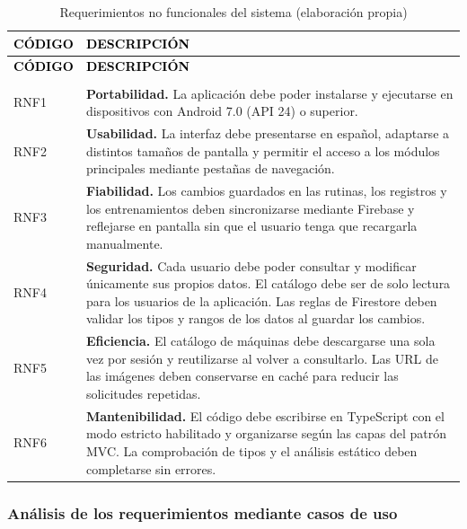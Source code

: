 \begin{longtable}{|L{2.2cm}|L{10.8cm}|}
\hline
{}
\textbf{\textcolor{black}{CÓDIGO}} &
\textbf{\textcolor{black}{DESCRIPCIÓN}} \\
\hline
\endfirsthead

\hline
{}
\textbf{\textcolor{black}{CÓDIGO}} &
\textbf{\textcolor{black}{DESCRIPCIÓN}} \\
\hline
\endhead

\endfoot

\caption{Requerimientos no funcionales del sistema (elaboración propia)}
\label{tab:rnf}\\
\endlastfoot

RNF1 & \textbf{Portabilidad.} La aplicación debe poder instalarse y
ejecutarse en dispositivos con Android 7.0 (API 24) o superior. \\
\hline

RNF2 & \textbf{Usabilidad.} La interfaz debe presentarse en español,
adaptarse a distintos tamaños de pantalla y permitir el acceso a los
módulos principales mediante pestañas de navegación. \\
\hline

RNF3 & \textbf{Fiabilidad.} Los cambios guardados en las rutinas, los
registros y los entrenamientos deben sincronizarse mediante Firebase
y reflejarse en pantalla sin que el usuario tenga que recargarla
manualmente. \\
\hline

RNF4 & \textbf{Seguridad.} Cada usuario debe poder consultar y modificar
únicamente sus propios datos. El catálogo debe ser de solo lectura
para los usuarios de la aplicación. Las reglas de Firestore deben
validar los tipos y rangos de los datos al guardar los cambios. \\
\hline

RNF5 & \textbf{Eficiencia.} El catálogo de máquinas debe descargarse
una sola vez por sesión y reutilizarse al volver a consultarlo.
Las URL de las imágenes deben conservarse en caché para reducir
las solicitudes repetidas. \\
\hline

RNF6 & \textbf{Mantenibilidad.} El código debe escribirse en TypeScript
con el modo estricto habilitado y organizarse según las capas del
patrón MVC. La comprobación de tipos y el análisis estático deben
completarse sin errores. \\
\hline
\end{longtable}

\subsubsection{Análisis de los requerimientos mediante casos de uso}


